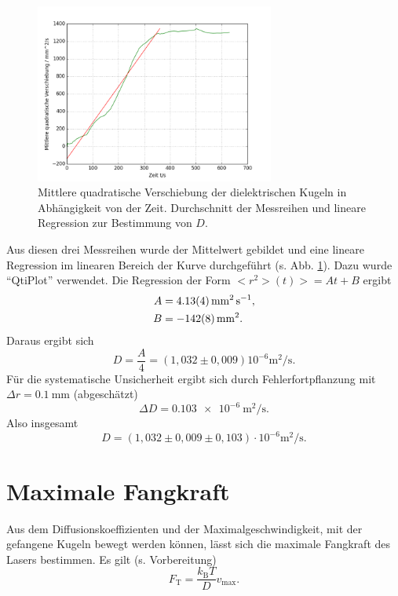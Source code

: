 \begin{figure}[tb]
	\centering\includegraphics[width=0.7\textwidth]{fig/brown_summe.png}
	\caption{Mittlere quadratische Verschiebung der dielektrischen Kugeln in Abhängigkeit von der Zeit. Durchschnitt der Messreihen und lineare Regression zur Bestimmung von $D$.}
	\label{fig:brown_summe}
\end{figure}

Aus diesen drei Messreihen wurde der Mittelwert gebildet und eine lineare Regression im linearen Bereich der Kurve durchgeführt (s. Abb. \ref{fig:brown_summe}). Dazu wurde ``QtiPlot'' verwendet.
Die Regression der Form $<r^{2}>(t)>=At+B$ ergibt
\begin{align}
 A &= \SI{4,13\pm0,04}{\milli\meter\squared\per\second}, \\
 B &= \SI{-142\pm8}{\milli\meter\squared}.
\end{align}
Daraus ergibt sich
\begin{equation}
 D = \frac{A}{4} = (1,032\pm0,009)10^{-6}\si{\meter\squared\per\second}.
\end{equation}
Für die systematische Unsicherheit ergibt sich durch Fehlerfortpflanzung mit $\Delta r=\SI{0,1}{\milli\metre}$ (abgeschätzt)
\begin{equation}
 \Delta D= \SI{0,103e-6}{\meter\squared\per\second}.
\end{equation}
Also insgesamt
\begin{equation}
 D = (1,032\pm0,009\pm0,103)\cdot 10^{-6}\si{\meter\squared\per\second}.
\end{equation}


\section{Maximale Fangkraft}

Aus dem Diffusionskoeffizienten und der Maximalgeschwindigkeit, mit der gefangene Kugeln bewegt werden können, lässt sich die maximale Fangkraft des Lasers bestimmen. Es gilt (s. Vorbereitung)
\begin{equation}
 F_{\textrm{T}} = \frac{k_{\textrm{B}}T}{D} v_{\textrm{max}}.
\end{equation}

